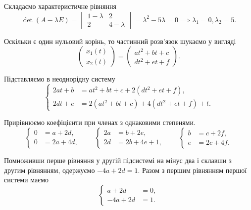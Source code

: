 \begin{solution}
	Складаємо характеристичне рівняння
	\begin{equation*}
		\det (A - \lambda E) = \begin{vmatrix} 1 - \lambda & 2 \\ 2 & 4 - \lambda \end{vmatrix} = \lambda^2 - 5 \lambda = 0 \implies \lambda_1 = 0, \lambda_2 = 5.
	\end{equation*}

	Оскільки є один нульовий корінь, то частинний розв'язок шукаємо у вигляді
	\begin{equation*}
		\begin{pmatrix} x_1(t) \\ x_2(t) \end{pmatrix} = \begin{pmatrix} a t^2 + b t + c \\ d t^2 + e t + f \end{pmatrix}.
	\end{equation*}

	Підставляємо в неоднорідну систему
	\begin{equation*}
		\left\{
			\begin{aligned}
				2 a t + b &= a t^2 + b t + c + 2 (d t^2 + e t + f), \\
				2 d t + e &= 2 (a t^2 + b t + c) + 4 (d t^2 + e t + f) + t.
			\end{aligned}
		\right.
	\end{equation*}

	Прирівнюємо коефіцієнти при членах з однаковими степенями.
	\begin{equation*}
		\left\{
			\begin{aligned}
				0 &= a + 2 d, \\
				0 &= 2 a + 4 d, 
			\end{aligned}
		\right. \qquad \left\{
			\begin{aligned}
				2 a &= b + 2 e, \\
				2 d &= 2 b + 4 e + 1, 
			\end{aligned}
		\right. \qquad \left\{
			\begin{aligned}
				b &= c + 2 f, \\
				e &= 2 c + 4 f.
			\end{aligned}
		\right.
	\end{equation*}

	Помноживши перше рівняння у другій підсистемі на мінус два і склавши з другим рівнянням, одержуємо $-4 a + 2 d = 1$. Разом з першим рівнянням першої системи маємо
	\begin{equation*}
		\left\{
			\begin{aligned}
				a + 2 d &= 0, \\
				- 4 a + 2 d &= 1.
			\end{aligned}
		\right.
	\end{equation*}


\end{solution}
